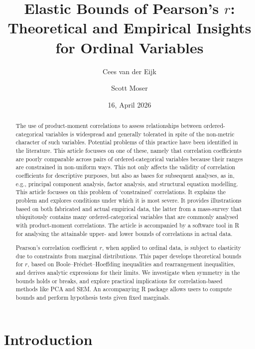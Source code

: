 \documentclass[
  12pt,
]{article}
\title{Elastic Bounds of Pearson's \(r\): Theoretical and Empirical
Insights for Ordinal Variables}
\author{Cees van der Eijk \and Scott Moser}
\date{16, April 2026}
\theoremstyle{plain}
\theoremstyle{definition}
\renewcommand*\contentsname{Table of contents}
\newcommand\contentsname{Table of contents}
\theoremstyle{remark}
\begin{document}
\maketitle

\renewcommand*\contentsname{Table of contents}
{
\hypersetup{linkcolor=}
\setcounter{tocdepth}{3}
\tableofcontents
}

\newpage

\begin{abstract}
The use of product-moment correlations to assess relationships between ordered-categorical variables is widespread and generally tolerated in spite of the non-metric character of such variables. Potential problems of this practice have been identified in the literature. This article focusses on one of these, namely that correlation coefficients are poorly comparable across pairs of ordered-categorical variables because their ranges are constrained in non-uniform ways. This not only affects the validity of correlation coefficients for descriptive purposes, but also as bases for subsequent analyses, as in, e.g., principal component analysis, factor analysis, and structural equation modelling. This article focusses on this problem of ‘constrained’ correlations. It explains the problem and explores conditions under which it is most severe. It provides illustrations based on both fabricated and actual empirical data, the latter from a mass-survey that ubiquitously contains many ordered-categorical variables that are commonly analysed with product-moment correlations. The article is accompanied by a software tool in R for analysing the attainable upper- and lower bounds of correlations in actual data. 

Pearson’s correlation coefficient $r$, when applied to ordinal data, is subject to elasticity due to constraints from marginal distributions. This paper develops theoretical bounds for $r$, based on Boole–Fréchet–Hoeffding inequalities and rearrangement inequalities, and derives analytic expressions for their limits. We investigate when symmetry in the bounds holds or breaks, and explore practical implications for correlation-based methods like PCA and SEM. An accompanying R package allows users to compute bounds and perform hypothesis tests given fixed marginals.
\end{abstract}

\newpage

\newpage

\section{Introduction}\label{sec-intro}
\end{document}
